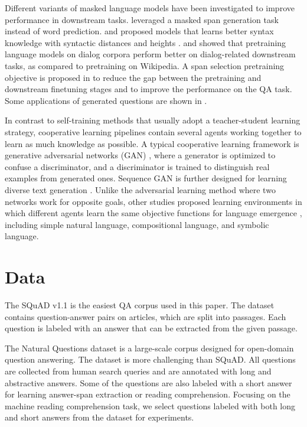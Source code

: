 \documentclass[11pt,a4paper]{article}
\begin{document}
Different variants of masked language models have been investigated to improve performance in downstream tasks. \citet{joshi2020spanbert} leveraged a masked span generation task instead of word prediction. \citet{fei2020retrofitting} and \citet{shen2020structformer} proposed models that learns better syntax knowledge with syntactic distances \cite{shen2018straight} and heights \cite{luo2019improving}. \citet{henderson2019convert} and \citet{humeau2019poly} showed that pretraining language models on dialog corpora perform better on dialog-related downstream tasks, as compared to pretraining on Wikipedia. A span selection pretraining objective is proposed in \citet{glass2019span} to reduce the gap between the pretraining and downstream finetuning stages and to improve the performance on the QA task. Some applications of generated questions are shown in \cite{lewis2021paq,jia2021question}.

In contrast to self-training methods that usually adopt a teacher-student learning strategy, cooperative learning pipelines contain several agents working together to learn as much knowledge as possible. A typical cooperative learning framework is generative adversarial networks (GAN) \cite{goodfellow2016nips,goodfellow2014generative}, where a generator is optimized to confuse a discriminator, and a discriminator is trained to distinguish real examples from generated ones. Sequence GAN is further designed for learning diverse text generation \cite{yu2017seqgan}. Unlike the adversarial learning method where two networks work for opposite goals, other studies proposed learning environments in which different agents learn the same objective functions for language emergence \cite{lazaridou2016multi,mordatch2018emergence,havrylov2017emergence}, including simple natural language, compositional language, and symbolic language.

\section{Data}
\label{sec:ddetail}
The SQuAD v1.1 is the easiest QA corpus used in this paper. The dataset contains  question-answer pairs on  articles, which are split into passages. Each question is labeled with an answer that can be extracted from the given passage.

The Natural Questions dataset is a large-scale corpus designed for open-domain question answering. The dataset is more challenging than SQuAD. All questions are collected from human search queries and are annotated with long and abstractive answers. Some of the questions are also labeled with a short answer for learning answer-span extraction or reading comprehension. Focusing on the machine reading comprehension task, we select  questions labeled with both long and short answers from the dataset for experiments.
\end{document}

